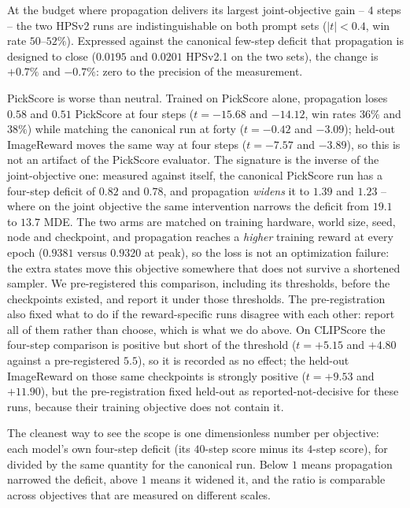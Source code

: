 At the budget where propagation delivers its largest joint-objective gain -- $4$ steps --
the two HPSv2 runs are indistinguishable on both prompt sets ($|t|<0.4$, win rate
$50$--$52\%$). Expressed against the canonical few-step deficit that propagation is designed
to close ($0.0195$ and $0.0201$ HPSv2.1 on the two sets), the change is $+0.7\%$ and
$-0.7\%$: zero to the precision of the measurement.

PickScore is worse than neutral. Trained on PickScore alone, propagation loses $0.58$ and
$0.51$ PickScore at four steps ($t=-15.68$ and $-14.12$, win rates $36\%$ and $38\%$) while
matching the canonical run at forty ($t=-0.42$ and $-3.09$); held-out ImageReward moves the
same way at four steps ($t=-7.57$ and $-3.89$), so this is not an artifact of the PickScore
evaluator. The signature is the inverse of the joint-objective one: measured against itself,
the canonical PickScore run has a four-step deficit of $0.82$ and $0.78$, and propagation
\emph{widens} it to $1.39$ and $1.23$ -- where on the joint objective the same intervention
narrows the deficit from $19.1$ to $13.7$ MDE. The two arms are matched on training
hardware, world size, seed, node and checkpoint, and propagation reaches a \emph{higher}
training reward at every epoch ($0.9381$ versus $0.9320$ at peak), so the loss is not an
optimization failure: the extra states move this objective somewhere that does not survive
a shortened sampler. We pre-registered this comparison, including its
thresholds, before the checkpoints existed, and report it under those thresholds. The
pre-registration also fixed what to do if the reward-specific runs disagree with each
other: report all of them rather than choose, which is what we do above. On CLIPScore the
four-step comparison is positive but short of the threshold ($t=+5.15$ and $+4.80$ against a
pre-registered $5.5$), so it is recorded as no effect; the held-out ImageReward on those same
checkpoints is strongly positive ($t=+9.53$ and $+11.90$), but the pre-registration fixed
held-out as reported-not-decisive for these runs, because their training objective does not
contain it.

The cleanest way to see the scope is one dimensionless number per objective: each model's
own four-step deficit (its $40$-step score minus its $4$-step score), for \MSP divided by
the same quantity for the canonical run. Below $1$ means propagation narrowed the deficit,
above $1$ means it widened it, and the ratio is comparable across objectives that are
measured on different scales.

